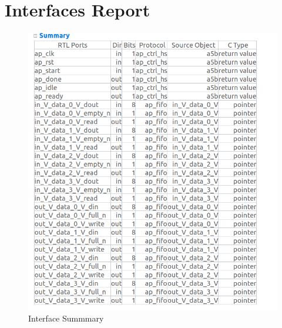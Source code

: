 \documentclass{article}
\begin{document}
\section{Interfaces Report}
\vspace{1cm}
\begin{figure}[h]
    \centering
\includegraphics[width=\columnwidth]{figs/3.png}
    \caption{Interface Summmary}
    \label{fig:my_label}
\end{figure}
\vspace{5cm}
\end{document}
